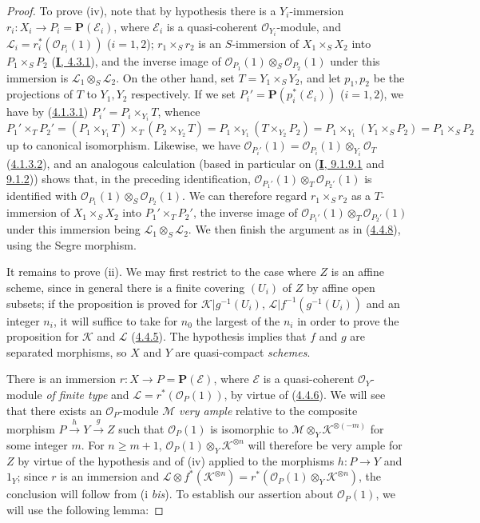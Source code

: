 \begin{proof}
To prove (iv), note that by hypothesis there is a $Y_i$-immersion
$r_i:X_i\to P_i=\mathbf{P}(\mathcal{E}_i)$, where $\mathcal{E}_i$ is a
quasi-coherent $\mathcal{O}_{Y_i}$-module, and
$\mathcal{L}_i=r_i^*(\mathcal{O}_{P_i}(1))$ ($i=1,2$);
$r_1\times_Sr_2$ is an $S$-immersion of $X_1\times_SX_2$ into
$P_1\times_SP_2$ (\hyperref[I.4.3.1]{\textbf{I}, 4.3.1}), and the inverse image of
$\mathcal{O}_{P_1}(1)\otimes_S\mathcal{O}_{P_2}(1)$ under this immersion is
$\mathcal{L}_1\otimes_S\mathcal{L}_2$. On the other hand, set
$T=Y_1\times_SY_2$, and let $p_1,p_2$ be the projections of $T$ to $Y_1,Y_2$
respectively. If we set
$P_i'=\mathbf{P}(p_i^*(\mathcal{E}_i))$ ($i=1,2$), we have by
(\hyperref[II.4.1.3.1]{4.1.3.1}) $P_i'=P_i\times_{Y_i}T$, whence
\[
  P_1'\times_TP_2'
  =(P_1\times_{Y_1}T)\times_T(P_2\times_{Y_2}T)
  =P_1\times_{Y_1}(T\times_{Y_2}P_2)
  =P_1\times_{Y_1}(Y_1\times_SP_2)
  =P_1\times_SP_2
\]
up to canonical isomorphism. Likewise, we have
$\mathcal{O}_{P_i'}(1)=\mathcal{O}_{P_i}(1)\otimes_{Y_i}\mathcal{O}_T$
(\hyperref[II.4.1.3.2]{4.1.3.2}), and an analogous calculation (based in
particular on (\hyperref[I.9.1.9.1]{\textbf{I}, 9.1.9.1} and
\hyperref[I.9.1.2]{9.1.2})) shows that, in the preceding identification,
$\mathcal{O}_{P_1'}(1)\otimes_T\mathcal{O}_{P_2'}(1)$ is identified with
$\mathcal{O}_{P_1}(1)\otimes_S\mathcal{O}_{P_2}(1)$. We can therefore regard
$r_1\times_Sr_2$ as a $T$-immersion of $X_1\times_SX_2$ into
$P_1'\times_TP_2'$, the inverse image of
$\mathcal{O}_{P_1'}(1)\otimes_T\mathcal{O}_{P_2'}(1)$ under this immersion
being $\mathcal{L}_1\otimes_S\mathcal{L}_2$. We then finish the argument
as in (\hyperref[II.4.4.8]{4.4.8}), using the Segre morphism.

It remains to prove (ii). We may first restrict to the case where $Z$ is an
affine scheme, since in general there is a finite covering $(U_i)$ of $Z$ by
affine open subsets; if the proposition is proved for
$\mathcal{K}|g^{-1}(U_i)$, $\mathcal{L}|f^{-1}(g^{-1}(U_i))$ and an integer
$n_i$, it will suffice to take for $n_0$ the largest of the $n_i$ in order to
prove the proposition for $\mathcal{K}$ and $\mathcal{L}$
(\hyperref[II.4.4.5]{4.4.5}). The hypothesis implies that $f$ and $g$ are
separated morphisms, so $X$ and $Y$ are quasi-compact \emph{schemes}.

There is an immersion $r:X\to P=\mathbf{P}(\mathcal{E})$, where $\mathcal{E}$ is
a quasi-coherent $\mathcal{O}_Y$-module \emph{of finite type} and
$\mathcal{L}=r^*(\mathcal{O}_P(1))$, by virtue of
(\hyperref[II.4.4.6]{4.4.6}). We will see that there exists an
$\mathcal{O}_P$-module $\mathcal{M}$ \emph{very ample} relative to the composite
morphism $P\xrightarrow{h}Y\xrightarrow{g}Z$ such that $\mathcal{O}_P(1)$ is
isomorphic to $\mathcal{M}\otimes_Y\mathcal{K}^{\otimes(-m)}$ for some integer
$m$. For $n\geq m+1$,
$\mathcal{O}_P(1)\otimes_Y\mathcal{K}^{\otimes n}$ will therefore be very ample
for $Z$ by virtue of the hypothesis and of (iv) applied to the morphisms
$h:P\to Y$ and $1_Y$; since $r$ is an immersion and
$\mathcal{L}\otimes f^*(\mathcal{K}^{\otimes n})
=r^*(\mathcal{O}_P(1)\otimes_Y\mathcal{K}^{\otimes n})$, the conclusion
will follow from (i \emph{bis}). To establish our assertion about $\mathcal{O}_P(1)$,
we will use the following lemma:


\end{proof}
